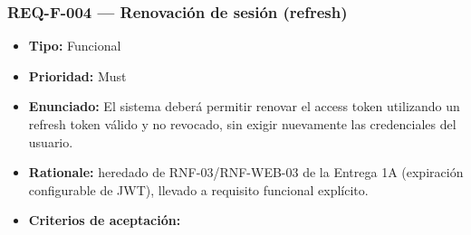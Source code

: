 \documentclass[
  spanish,
]{article}
\providecommand{\tightlist}{%
  \setlength{\itemsep}{0pt}\setlength{\parskip}{0pt}}
\begin{document}
\subsubsection{REQ-F-004 --- Renovación de sesión
(refresh)}\label{req-f-004-renovaciuxf3n-de-sesiuxf3n-refresh}

\begin{itemize}
\tightlist
\item
  \textbf{Tipo:} Funcional
\item
  \textbf{Prioridad:} Must
\item
  \textbf{Enunciado:} El sistema deberá permitir renovar el access token
  utilizando un refresh token válido y no revocado, sin exigir
  nuevamente las credenciales del usuario.
\item
  \textbf{Rationale:} heredado de RNF-03/RNF-WEB-03 de la Entrega 1A
  (expiración configurable de JWT), llevado a requisito funcional
  explícito.
\item
  \textbf{Criterios de aceptación:}


\end{itemize}
\end{document}
